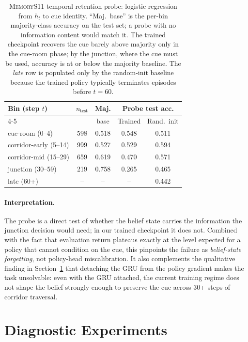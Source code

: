 \documentclass[letterpaper]{article}
\begin{document}
\begin{table}[!tbp]
\centering
\footnotesize
\setlength{\tabcolsep}{4pt}
\begin{tabular}{lcccc}
\toprule
Bin (step $t$) & $n_\text{test}$ & Maj. & \multicolumn{2}{c}{Probe test acc.} \\
\cmidrule(lr){4-5}
 & & base & Trained & Rand.\ init \\
\midrule
cue-room (0--4)       & 598  & 0.518 & 0.548 & 0.511 \\
corridor-early (5--14)  & 999  & 0.527 & 0.529 & 0.594 \\
corridor-mid (15--29)   & 659  & 0.619 & 0.470 & 0.571 \\
junction (30--59)      & 219  & 0.758 & 0.265 & 0.465 \\
late (60+)             & --   & --    & --    & 0.442 \\
\bottomrule
\end{tabular}
\caption{\textsc{MemoryS11} temporal retention probe: logistic regression
from $h_t$ to cue identity. ``Maj.\ base'' is the per-bin majority-class
accuracy on the test set; a probe with no information content would match
it. The trained checkpoint recovers the cue barely above majority only in
the cue-room phase; by the junction, where the cue must be used,
accuracy is at or below the majority baseline. The \emph{late} row is
populated only by the random-init baseline because the trained policy
typically terminates episodes before $t\!=\!60$.}
\label{tab:probe}
\end{table}

\paragraph{Interpretation.}
The probe is a direct test of whether the belief state carries the
information the junction decision would need; in our trained checkpoint
it does not. Combined with the fact that evaluation return plateaus
exactly at the level expected for a policy that cannot condition on the
cue, this pinpoints the failure as \emph{belief-state forgetting},
not policy-head miscalibration. It also complements the qualitative
finding in Section~\ref{sec:diagnostics} that detaching the GRU from the
policy gradient makes the task unsolvable: even with the GRU attached,
the current training regime does not shape the belief strongly enough
to preserve the cue across 30+ steps of corridor traversal.

\section{Diagnostic Experiments}
\label{sec:diagnostics}
\end{document}
